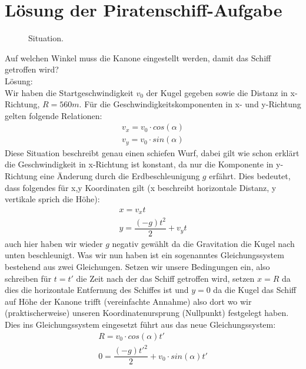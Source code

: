 \documentclass[12pt]{article}
\begin{document}
\section{Lösung der Piratenschiff-Aufgabe}
\begin{figure}[H]
  \caption{Situation.}
  \label{fig:1teil}
\end{figure}
Auf welchen Winkel muss die Kanone eingestellt werden, damit das Schiff getroffen wird?\\
Lösung:\\
Wir haben die Startgeschwindigkeit $v_0$ der Kugel gegeben sowie die Distanz in x-Richtung, $R = 560m$. Für die Geschwindigkeitskomponenten in x- und y-Richtung gelten folgende Relationen:
\begin{equation}
\begin{split}
v_x = v_0 \cdot cos(\alpha) \\
v_y = v_0 \cdot sin(\alpha)
\end{split}
\end{equation}
Diese Situation beschreibt genau einen schiefen Wurf, dabei gilt wie schon erklärt die Geschwindigkeit in x-Richtung ist konstant, da nur die Komponente in y-Richtung eine Änderung durch die Erdbeschleunigung $g$ erfährt. Dies bedeutet, dass folgendes für x,y Koordinaten gilt (x beschreibt horizontale Distanz, y vertikale sprich die Höhe):
\begin{equation}
\begin{split}
x = v_xt \\
y = \dfrac{(-g)t^2}{2} + v_yt
\end{split}
\end{equation}
auch hier haben wir wieder $g$ negativ gewählt da die Gravitation die Kugel nach unten beschleunigt. Was wir nun haben ist ein sogenanntes Gleichungssystem bestehend aus zwei Gleichungen. Setzen wir unsere Bedingungen ein, also schreiben für $t=t'$ die Zeit nach der das Schiff getroffen wird, setzen $x=R$ da dies die horizontale Entfernung des Schiffes ist und $y=0$ da die Kugel das Schiff auf Höhe der Kanone trifft (vereinfachte Annahme) also dort wo wir (praktischerweise) unseren Koordinatenursprung (Nullpunkt) festgelegt haben. Dies ins Gleichungssystem eingesetzt führt aus das neue Gleichungssystem:
\begin{equation}
\begin{split}
R = v_0 \cdot cos(\alpha)t' \\
0 = \dfrac{(-g)t'^2}{2} + v_0 \cdot sin(\alpha)t'
\end{split}
\end{equation}
\end{document}
